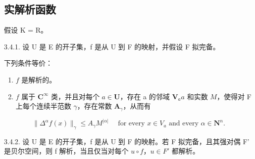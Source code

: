 \subsection{实解析函数}

假设 K = R。

3.4.1. 设 U 是 E 的开子集，f 是从 U 到 F 的映射，并假设 F 拟完备。

下列条件等价：

\begin{enumerate}
\def\labelenumi{(\roman{enumi})}
\item
  \(f\) 是解析的。
\item
  \(f\) 属于 \(\mathbf{C}^{\infty}\) 类，并且对每个 \(a\in\mathbf{U} \)，存在 a 的邻域 \(\mathbf{V}_{a}\)\(a\) 和实数 \(M\)，使得对 F 上每个连续半范数 \(\gamma\)，存在常数 \(\mathbf{A}_{\gamma}\)，从而有
\end{enumerate}

\[
\| \Delta^ {\alpha} f (x) \| _ {\gamma} \leqslant A _ {\gamma} M ^ {| \alpha |} \quad \text {   for   every   } x \in V _ {a} \text {   and   every   } \alpha \in \mathbf {N} ^ {n}.
\]

3.4.2. 设 U 是 E 的开子集，f 是从 U 到 F 的映射。若 F 拟完备，且其强对偶 F' 是贝尔空间，则 f 解析，当且仅当对每个 \(u \circ f\)，\(u \in F'\) 都解析。


